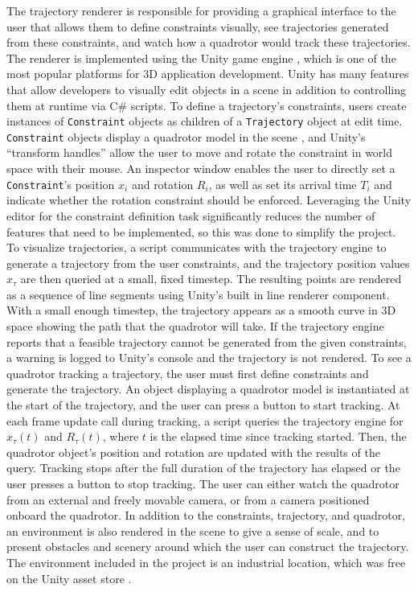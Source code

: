 \documentclass[pageno]{jpaper}
\newcommand{\quotes}[1]{``#1''}
\begin{document}
The trajectory renderer is responsible for providing a graphical interface to the user that allows them to define constraints visually, see trajectories generated from these constraints, and watch how a quadrotor would track these trajectories. The renderer is implemented using the Unity game engine \cite{unity}, which is one of the most popular platforms for 3D application development. Unity has many features that allow developers to visually edit objects in a scene in addition to controlling them at runtime via C\# scripts. To define a trajectory's constraints, users create instances of \texttt{Constraint} objects as children of a \texttt{Trajectory} object at edit time. \texttt{Constraint} objects display a quadrotor model in the scene \cite{model}, and Unity's \quotes{transform handles} allow the user to move and rotate the constraint in world space with their mouse. An inspector window enables the user to directly set a \texttt{Constraint}'s position $x_i$ and rotation $R_i$, as well as set its arrival time $T_i$ and indicate whether the rotation constraint should be enforced. Leveraging the Unity editor for the constraint definition task significantly reduces the number of features that need to be implemented, so this was done to simplify the project. To visualize trajectories, a script communicates with the trajectory engine to generate a trajectory from the user constraints, and the trajectory position values $x_\tau$ are then queried at a small, fixed timestep. The resulting points are rendered as a sequence of line segments using Unity's built in line renderer component. With a small enough timestep, the trajectory appears as a smooth curve in 3D space showing the path that the quadrotor will take. If the trajectory engine reports that a feasible trajectory cannot be generated from the given constraints, a warning is logged to Unity's console and the trajectory is not rendered. To see a quadrotor tracking a trajectory, the user must first define constraints and generate the trajectory. An object displaying a quadrotor model is instantiated at the start of the trajectory, and the user can press a button to start tracking. At each frame update call during tracking, a script queries the trajectory engine for $x_\tau(t)$ and $R_\tau(t)$, where $t$ is the elapsed time since tracking started. Then, the quadrotor object's position and rotation are updated with the results of the query. Tracking stops after the full duration of the trajectory has elapsed or the user presses a button to stop tracking. The user can either watch the quadrotor from an external and freely movable camera, or from a camera positioned onboard the quadrotor. In addition to the constraints, trajectory, and quadrotor, an environment is also rendered in the scene to give a sense of scale, and to present obstacles and scenery around which the user can construct the trajectory. The environment included in the project is an industrial location, which was free on the Unity asset store \cite{scene}.
\end{document}
